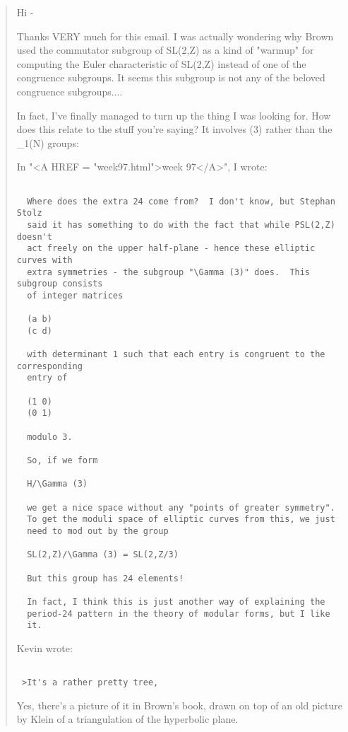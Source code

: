 \begin{quote}
 Hi -

 Thanks VERY much for this email.  I was actually wondering why
 Brown used the commutator subgroup of SL(2,Z) as a kind of "warmup"
 for computing the Euler characteristic of SL(2,Z) instead of one of
 the congruence subgroups.  It seems this subgroup is not any of the
 beloved congruence subgroups....

 In fact, I've finally managed to turn up the thing I was looking
 for.  How does this relate to the stuff you're saying?  It involves
 \Gamma (3) rather than the \Gamma _{1}(N) groups:

 In "<A HREF = "week97.html">week 97</A>", I wrote:


\begin{verbatim}

  Where does the extra 24 come from?  I don't know, but Stephan Stolz
  said it has something to do with the fact that while PSL(2,Z) doesn't
  act freely on the upper half-plane - hence these elliptic curves with
  extra symmetries - the subgroup "\Gamma (3)" does.  This subgroup consists
  of integer matrices

  (a b)
  (c d)

  with determinant 1 such that each entry is congruent to the corresponding
  entry of

  (1 0)
  (0 1)

  modulo 3.

  So, if we form

  H/\Gamma (3)

  we get a nice space without any "points of greater symmetry".
  To get the moduli space of elliptic curves from this, we just
  need to mod out by the group

  SL(2,Z)/\Gamma (3) = SL(2,Z/3)

  But this group has 24 elements!

  In fact, I think this is just another way of explaining the
  period-24 pattern in the theory of modular forms, but I like
  it.
\end{verbatim}
    


 Kevin wrote:

\begin{verbatim}

 >It's a rather pretty tree,
\end{verbatim}
    
 Yes, there's a picture of it in Brown's book, drawn on top of
 an old picture by Klein of a triangulation of the hyperbolic
 plane.


\end{quote}
